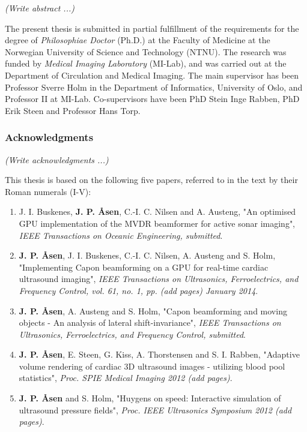 \documentclass[10pt,b5paper,twoside]{book}
\newcommand\todo[1]{{\textit{\color{red}(#1)}}}
\begin{document}
\thispagestyle{empty}%
\todo{Write abstract ...}




%
\thispagestyle{empty}%
The present thesis is submitted in partial fulfillment of the requirements for the degree of \textit{Philosophiae Doctor} (Ph.D.) at the Faculty of Medicine at the Norwegian University of Science and Technology (NTNU). The research was funded by \textit{Medical Imaging Laboratory} (MI-Lab), and was carried out at the Department of Circulation and Medical Imaging. The main supervisor has been Professor Sverre Holm  in the Department of Informatics, University of Oslo, and Professor II at MI-Lab. Co-supervisors have been PhD Stein Inge Rabben, PhD Erik Steen and Professor Hans Torp.


\subsubsection{Acknowledgments}
\todo{Write acknowledgments ...}

This thesis is based on the following five papers, referred to in the text by their Roman numerals (I-V): 
\begin{enumerate}[I]
\renewcommand\labelenumi{\bfseries\theenumi}
	\item J. I. Buskenes, \textbf{J. P. \AA{}sen}, C.-I. C. Nilsen and A. Austeng, "An optimised GPU implementation of the MVDR beamformer for active sonar imaging", {\it  IEEE Transactions on Oceanic Engineering, submitted}.
	\item \textbf{J. P. \AA{}sen}, J. I. Buskenes, C.-I. C. Nilsen, A. Austeng and S. Holm, "Implementing Capon beamforming on a GPU for real-time cardiac ultrasound imaging", {\it IEEE Transactions on Ultrasonics, Ferroelectrics, and Frequency Control, vol. 61, no. 1, pp. \todo{add pages} January 2014}.
 	\item \textbf{J. P. \AA{}sen}, A. Austeng and S. Holm, "Capon beamforming and moving objects - An analysis of lateral shift-invariance", {\it IEEE Transactions on Ultrasonics, Ferroelectrics, and Frequency Control, submitted}.
	\item \textbf{J. P. \AA{}sen}, E. Steen, G. Kiss, A. Thorstensen and S. I. Rabben, "Adaptive volume rendering of cardiac 3D ultrasound images - utilizing blood pool statistics", {\it Proc. SPIE Medical Imaging 2012 \todo{add pages}}.
	\item \textbf{J. P. \AA{}sen} and S. Holm, "Huygens on speed: Interactive simulation of ultrasound pressure fields", {\it Proc. IEEE Ultrasonics Symposium 2012 \todo{add pages}}.
\end{enumerate}  
\end{document}
